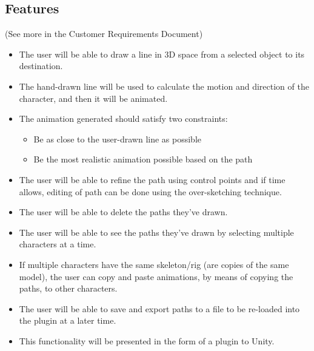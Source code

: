 \subsection{Features}
(See more in the Customer Requirements Document)
\begin{itemize}
 \item The user will be able to draw a line in 3D space from a selected object to its destination.
 \item The hand-drawn line will be used to calculate the motion and direction of the character, and then it will be animated.
 \item The animation generated should satisfy two constraints:
	\begin{itemize}
	  \item Be as close to the user-drawn line as possible
	  \item Be the most realistic animation possible based on the path
	\end{itemize}
 \item The user will be able to refine the path using control points and if time allows, editing of path can be done using the over-sketching technique.
 \item The user will be able to delete the paths they've drawn.
 \item The user will be able to see the paths they've drawn by selecting multiple characters at a time.
 \item If multiple characters have the same skeleton/rig (are copies of the same model), the user can copy and paste animations, by means of copying the paths, to other characters.
\item The user will be able to save and export paths to a file to be re-loaded into the plugin at a later time.
 \item This functionality will be presented in the form of a plugin to Unity.
\end{itemize}
